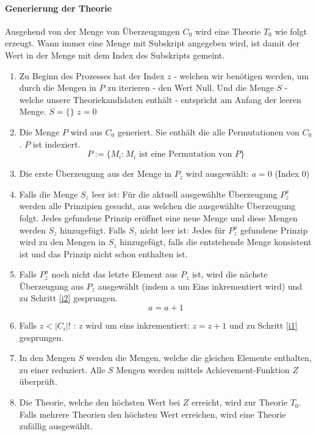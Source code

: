 \documentclass{article}
\begin{document}
\paragraph{Generierung der Theorie}
Ausgehend von der Menge von Überzeugungen $C_0$ wird eine Theorie $T_0$ wie folgt erzeugt. Wann immer eine Menge mit Subskript angegeben wird, ist damit der Wert in der Menge mit dem Index des Subskripts gemeint.
\begin{enumerate}
    \item Zu Beginn des Prozesses hat der Index $z$ - welchen wir benötigen werden, um durch die Mengen in $P$ zu iterieren - den Wert Null. Und die Menge $S$ - welche unsere Theoriekandidaten enthält - entspricht am Anfang der leeren Menge. $S = \{\}$ $z = 0$
    \item Die Menge $P$ wird aus $C_0$ generiert. Sie enthält die alle Permutationen von $C_0$. $P$ ist indexiert.
    $$
        P := \{ M_i : M_i \text{ ist eine Permutation von } P\}
    $$
    \item \label{i1} Die erste Überzeugung aus der Menge in $P_z$ wird ausgewählt: $a = 0$ (Index 0)
    \item \label{i2} Falls die Menge $S_z$ leer ist: Für die aktuell ausgewählte Überzeugung $P_z^a$ werden alle Prinzipien gesucht, aus welchen die ausgewählte Überzeugung folgt. Jedes gefundene Prinzip eröffnet eine neue Menge und diese Mengen werden $S_z$ hinzugefügt. Falls $S_z$ nicht leer ist: Jedes für $P_z^a$ gefundene Prinzip wird zu den Mengen in $S_z$ hinzugefügt, falls die entstehende Menge konsistent ist und das Prinzip nicht schon enthalten ist.
    \item \label{i3} Falls $P_z^a$ noch nicht das letzte Element aus $P_z$ ist, wird die nächste Überzeugung aus $P_z$ ausgewählt (indem a um Eins inkrementiert wird) und zu Schritt \ref{i2} gesprungen.
    $$
        a = a + 1
    $$
    \item \label{i4} Falls $z < \lvert C_i \rvert!$ : $z$ wird um eins inkrementiert: $z = z + 1$ und zu Schritt \ref{i1} gesprungen.
    \item \label{i5} In den Mengen $S$ werden die Mengen, welche die gleichen Elemente enthalten, zu einer reduziert. Alle $S$ Mengen werden mittels Achievement-Funktion $Z$ überprüft.
    \item \label{i6} Die Theorie, welche den höchsten Wert bei $Z$ erreicht, wird zur Theorie $T_0$. Falls mehrere Theorien den höchsten Wert erreichen, wird eine Theorie zufällig ausgewählt.
\end{enumerate}
\end{document}
